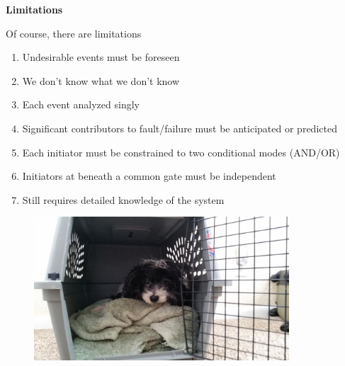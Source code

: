 \documentclass[aspectratio=1610,pdftex,dvipsnames,compress,xcolor={dvipsnames}]{beamer}
\begin{document}
\begin{frame}[plain]{}
    \centering\LARGE\textbf{Limitations}
\end{frame}


\addtocounter{framenumber}{-1}
\begin{frame}{Of course, there are limitations}
    \begin{enumerate}[series=outerlist,topsep=0pt,itemsep=15pt,leftmargin=*,label=(\arabic*)]
        \item[]Undesirable events must be foreseen  
        \item[]We don't know what we don't know
        \item[]Each event analyzed singly
        \item[]Significant contributors to fault/failure must be anticipated or predicted
        \item[]Each initiator must be constrained to two conditional modes (AND/OR)
        \item[]Initiators at beneath a common gate must be independent 
        \item[]Still requires detailed knowledge of the system
    \end{enumerate}
\end{frame}


\begin{frame}[plain]{}
    \begin{figure}
        \centering
        \includegraphics[width=0.85\textwidth]{final.jpg}
    \end{figure}
\end{frame}
\end{document}
